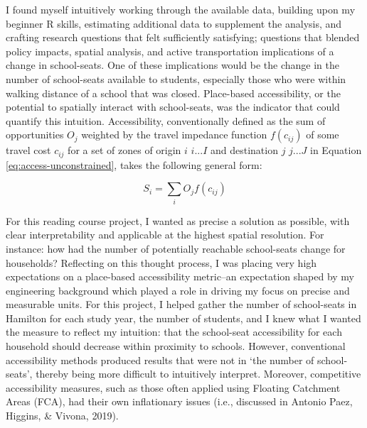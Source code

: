 \documentclass[
11pt, %
oneside, %
english, %
singlespacing, %
]{macthesis} %
\begin{document}
I found myself intuitively working through the available data, building upon my beginner R skills, estimating additional data to supplement the analysis, and crafting research questions that felt sufficiently satisfying; questions that blended policy impacts, spatial analysis, and active transportation implications of a change in school-seats. One of these implications would be the change in the number of school-seats available to students, especially those who were within walking distance of a school that was closed. Place-based accessibility, or the potential to spatially interact with school-seats, was the indicator that could quantify this intuition. Accessibility, conventionally defined as the sum of opportunities \(O_j\) weighted by the travel impedance function \(f(c_{ij})\) of some travel cost \(c_{ij}\) for a set of zones of origin \(i\) \(i...I\) and destination \(j\) \(j...J\) in Equation \ref{eq:access-unconstrained}, takes the following general form:

\begin{equation}
\label{eq:access-unconstrained}
S_i = \sum_i O_j f(c_{ij}) 
\end{equation} 

For this reading course project, I wanted as precise a solution as possible, with clear interpretability and applicable at the highest spatial resolution. For instance: how had the number of potentially reachable school-seats change for households? Reflecting on this thought process, I was placing very high expectations on a place-based accessibility metric--an expectation shaped by my engineering background which played a role in driving my focus on precise and measurable units. For this project, I helped gather the number of school-seats in Hamilton for each study year, the number of students, and I knew what I wanted the measure to reflect my intuition: that the school-seat accessibility for each household should decrease within proximity to schools. However, conventional accessibility methods produced results that were not in `the number of school-seats', thereby being more difficult to intuitively interpret. Moreover, competitive accessibility measures, such as those often applied using Floating Catchment Areas (FCA), had their own inflationary issues (i.e., discussed in Antonio Paez, Higgins, \& Vivona, 2019).
\end{document}
